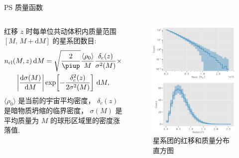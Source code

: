 \documentclass{beamer}
\newcommand{\R}[1]{\text{#1}}  %
\newcommand{\Cpi}{\piup}  %
\newcommand{\D}[1]{\R{d}#1}
\newcommand{\diff}[2]{\frac{\D{#1}}{\D{#2}}}
\begin{document}
\begin{frame}{PS 质量函数}
  \begin{columns}
    红移 $z$ 时每单位共动体积内质量范围 $[M,\, M+\D{M}]$ 的星系团数目:
    \begin{multline}
      n_{\R{cl}}(M,z) \,\D{M} =
        \sqrt{\frac{2}{\Cpi}} \frac{\langle \rho_0 \rangle}{M}
        \frac{\delta_c(z)}{\sigma^2(M)} \times \\
        \left| \diff{\sigma(M)}{M} \right|
        \exp\!\left[ -\frac{\delta_c^2(z)}{2\sigma^2(M)} \right]
        \,\D{M} ,
    \end{multline}
    $\langle \rho_0 \rangle$ 是当前的宇宙平均密度，
    $\delta_c(z)$ 是暗物质坍缩的临界密度，
    $\sigma(M)$ 是平均质量为 $M$ 的球形区域里的密度涨落值.

    \begin{figure}
      \centering
      \includegraphics[width=\columnwidth]{mass-z-dist}
      \caption{星系团的红移和质量分布直方图}
    \end{figure}
  \end{columns}
\end{frame}
\end{document}
